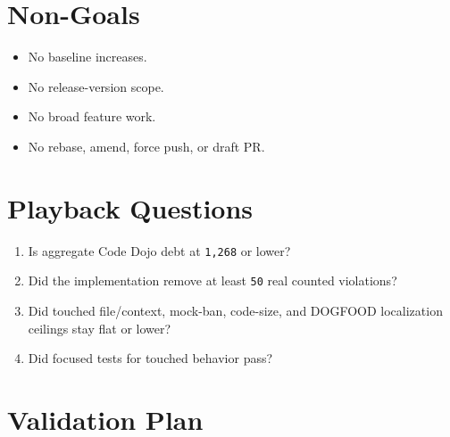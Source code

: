 \section{Non-Goals}\label{record-230-non-goals}

\begin{itemize}
\tightlist
\item
  No baseline increases.
\item
  No release-version scope.
\item
  No broad feature work.
\item
  No rebase, amend, force push, or draft PR.
\end{itemize}

\section{Playback Questions}\label{record-230-playback-questions}

\begin{enumerate}
\def\labelenumi{\arabic{enumi}.}
\tightlist
\item
  Is aggregate Code Dojo debt at \texttt{1\allowbreak{},\allowbreak{}2\allowbreak{}6\allowbreak{}8} or lower?
\item
  Did the implementation remove at least \texttt{5\allowbreak{}0} real counted violations?
\item
  Did touched file/context, mock-ban, code-size, and DOGFOOD localization ceilings stay flat or lower?
\item
  Did focused tests for touched behavior pass?
\end{enumerate}

\section{Validation Plan}\label{record-230-validation-plan}

